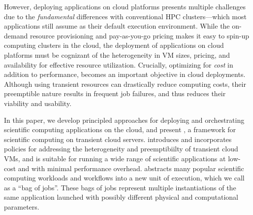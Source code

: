 
However, deploying applications on cloud platforms presents multiple challenges due to the \emph{fundamental} differences with conventional HPC clusters---which most applications still assume as their default execution environment.
While the on-demand resource provisioning and pay-as-you-go pricing makes it easy to spin-up computing clusters in the cloud, the deployment of applications on cloud platforms must be cognizant of the heterogeneity in VM sizes, pricing, and availability for effective resource utilization. 
Crucially, optimizing for \emph{cost} in addition to performance, becomes an important objective in cloud deployments.
%
Although using transient resources can drastically reduce computing costs, their preemptible nature results in frequent job failures, and thus reduces their viability and usability. 
%



In this paper, we develop principled approaches for deploying and orchestrating  scientific computing applications on the cloud, and present \sysname, a framework for scientific computing on transient cloud servers.
%
\sysname introduces and incorporates policies for addressing the heterogeneity and preemptibiilty of transient cloud VMs, and is suitable for running a wide range of scientific applications at low-cost and with minimal performance overhead.
%
\sysname abstracts many popular scientific computing workloads and workflows into a new unit of execution, which we call as a ``bag of jobs''. 
These bags of jobs represent multiple instantiations of the same application launched with possibly different physical and computational parameters. 



